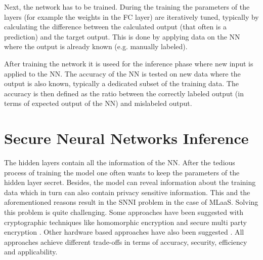 \documentclass[../thesis.tex]{subfiles}
\begin{document}
Next, the network has to be trained. During the training the parameters of the layers (for example the weights in the FC layer) are iteratively tuned, typically by calculating the difference between the calculated output (that often is a prediction) and the target output. This is done by applying data on the NN where the output is already known (e.g. manually labeled). 


After training the network it is useed for the inference phase where new input is applied to the NN. The accuracy of the NN is tested on new data where the output is also known, typically a dedicated subset of the training data. The accuracy is then defined as the ratio between the correctly labeled output (in terms of expected output of the NN) and mislabeled output.


\section{Secure Neural Networks Inference}
The hidden layers contain all the information of the NN. After the tedious process of training the model one often wants to keep the parameters of the hidden layer secret. Besides, the model can reveal information about the training data \parencite{qayyum2020} which in turn can also contain privacy sensitive information. This and the aforementioned reasons result in the SNNI problem in the case of MLaaS. Solving this problem is quite challenging. Some approaches have been suggested with cryptographic techniques like homomorphic encryption \parencite{rivest1978} and secure multi party encryption \parencite{yao1982, yao1986}. Other hardware based approaches have also been suggested \parencite{deepsecure}. All approaches achieve different trade-offs in terms of accuracy, security, efficiency and applicability. 
\end{document}
